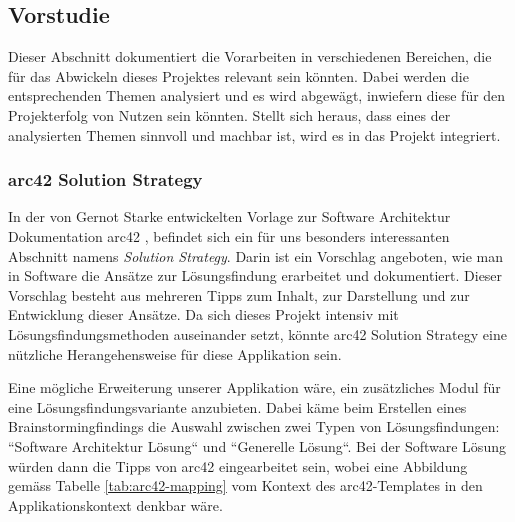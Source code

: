 \subsection{Vorstudie}
Dieser Abschnitt dokumentiert die Vorarbeiten in verschiedenen Bereichen, die für das Abwickeln dieses Projektes relevant sein könnten. Dabei werden die entsprechenden Themen analysiert und es wird abgewägt, inwiefern diese für den Projekterfolg von Nutzen sein könnten. Stellt sich heraus, dass eines der analysierten Themen sinnvoll und machbar ist, wird es in das Projekt integriert.
\subsubsection{arc42 Solution Strategy}

In der von Gernot Starke entwickelten Vorlage zur Software Architektur Dokumentation arc42 \cite{arc-42}, befindet sich ein für uns besonders interessanten Abschnitt namens \textit{Solution Strategy}. Darin ist ein Vorschlag angeboten, wie man in Software die Ansätze zur Lösungsfindung erarbeitet und dokumentiert. Dieser Vorschlag besteht aus mehreren Tipps zum Inhalt, zur Darstellung und zur Entwicklung dieser Ansätze. Da sich dieses Projekt intensiv mit Lösungsfindungsmethoden auseinander setzt, könnte arc42 Solution Strategy eine nützliche Herangehensweise für diese Applikation sein. 

Eine mögliche Erweiterung unserer Applikation wäre, ein zusätzliches Modul für eine Lösungsfindungsvariante anzubieten. Dabei käme beim Erstellen eines Brainstormingfindings die Auswahl zwischen zwei Typen von Lösungsfindungen: ``Software Architektur Lösung`` und ``Generelle Lösung``. Bei der Software Lösung würden dann die Tipps von arc42 eingearbeitet sein, wobei eine Abbildung gemäss Tabelle \ref{tab:arc42-mapping} vom Kontext des arc42-Templates in den Applikationskontext denkbar wäre.

